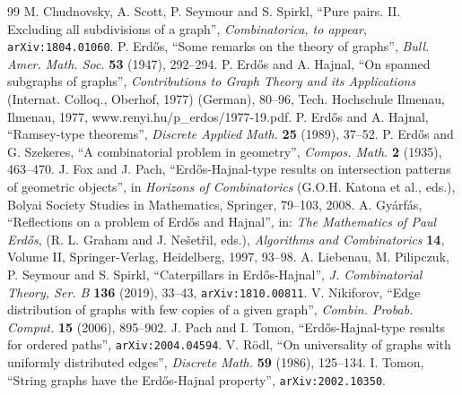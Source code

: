 \documentclass[titlepage,11pt]{article}
\begin{document}
\begin{thebibliography}{99}
M. Chudnovsky, A. Scott, P. Seymour and S. Spirkl,
``Pure pairs. II. Excluding all subdivisions of a graph'', {\em Combinatorica, to appear}, {\tt arXiv:1804.01060}.
P. Erd\H os, ``Some remarks on the theory of graphs'', {\em Bull. Amer. Math. Soc.} {\bf 53} (1947), 292--294.
 P. Erd\H{o}s and A. Hajnal, ``On spanned subgraphs of graphs'',
{\em Contributions to Graph Theory and its
Applications} (Internat. Colloq., Oberhof, 1977) (German), 80--96, Tech.
Hochschule Ilmenau, Ilmenau, 1977, \verb++{www.renyi.hu/\raisebox{-1ex}{\textasciitilde}p\_erdos/1977-19.pdf}.
  P. Erd\H{o}s and A. Hajnal, ``Ramsey-type theorems'',
{\em  Discrete Applied Math.} {\bf 25} (1989), 37--52.
P. Erd\H os and G. Szekeres, ``A combinatorial problem in geometry'', {\em Compos. Math.} {\bf 2} (1935),
463--470.
J. Fox and J. Pach, ``Erd\H os-Hajnal-type results on intersection patterns of geometric objects'', in
{\em Horizons of Combinatorics} (G.O.H. Katona et al., eds.), Bolyai Society Studies in Mathematics,
Springer, 79--103, 2008.
 A. Gy\'arf\'as, ``Reflections on a problem of Erd\H os and Hajnal'', in: {\em The Mathematics of
Paul Erd\H os}, (R. L. Graham and J. Ne\v set\v ril, eds.), {\em Algorithms and Combinatorics} {\bf 14},
Volume II, Springer-Verlag, Heidelberg, 1997, 93--98.
 A. Liebenau, M. Pilipczuk, P. Seymour and S. Spirkl, ``Caterpillars in Erd\H os-Hajnal'', {\em J. Combinatorial Theory, Ser. B} {\bf 136} (2019), 33--43, {\tt arXiv:1810.00811}.
  V. Nikiforov, ``Edge distribution of graphs with few copies of a given graph'', {\em Combin. Probab.
Comput.} {\bf 15} (2006), 895--902.
 J. Pach and I. Tomon, ``Erd\H{o}s-Hajnal-type results for ordered paths'', {\tt arXiv:2004.04594}.
 V. R\"odl, ``On universality of graphs with uniformly distributed edges'',
{\em Discrete Math.} {\bf 59} (1986), 125--134.
 I. Tomon, ``String graphs have the Erd\H{o}s-Hajnal property'', {\tt arXiv:2002.10350}.

\end{thebibliography}
\end{document}
